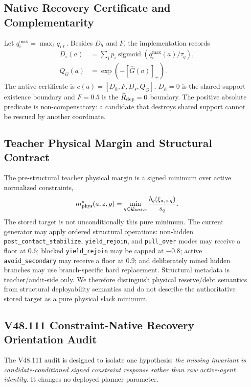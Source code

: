 \documentclass[conference]{IEEEtran}
\DeclareMathOperator{\sigmoid}{sigmoid}
\begin{document}
\subsection{Native Recovery Certificate and Complementarity}
Let $q_i^{\max}=\max_\ell q_{i\ell}$. Besides $D_h$ and $F$, the implementation records
\begin{align}
 D_s(a)&=\sum_i p_i\sigmoid(q_i^{\max}(a)/\tau_q),\\
 Q_G(a)&=\exp(-[\widehat G(a)]_+).
\end{align}
The native certificate is $c(a)=[D_h,F,D_s,Q_G]$. $D_h=0$ is the shared-support existence boundary and $F=0.5$ is the $\widehat R_{\rm dep}=0$ boundary. The positive absolute predicate is non-compensatory: a candidate that destroys shared support cannot be rescued by another coordinate.

\subsection{Teacher Physical Margin and Structural Contract}
The pre-structural teacher physical margin is a signed minimum over active normalized constraints,
\begin{equation}
 m_{\rm phys}^{\star}(a,z,g)=\min_{q\in\mathcal Q_{\rm active}}\frac{b_q(\xi_{a,z,g})}{s_q}.
\end{equation}
The stored target is not unconditionally this pure minimum. The current generator may apply ordered structural operations: non-hidden \texttt{post\_contact\_stabilize}, \texttt{yield\_rejoin}, and \texttt{pull\_over} modes may receive a floor at $0.6$; blocked \texttt{yield\_rejoin} may be capped at $-0.8$; active \texttt{avoid\_secondary} may receive a floor at $0.9$; and deliberately mined hidden branches may use branch-specific hard replacement. Structural metadata is teacher/audit-side only. We therefore distinguish physical reserve/debt semantics from structural deployability semantics and do not describe the authoritative stored target as a pure physical slack minimum.

\subsection{V48.111 Constraint-Native Recovery Orientation Audit}
\label{app:cnro}
The V48.111 audit is designed to isolate one hypothesis: \emph{the missing invariant is candidate-conditioned signed constraint response rather than raw active-agent identity}. It changes no deployed planner parameter.
\end{document}
